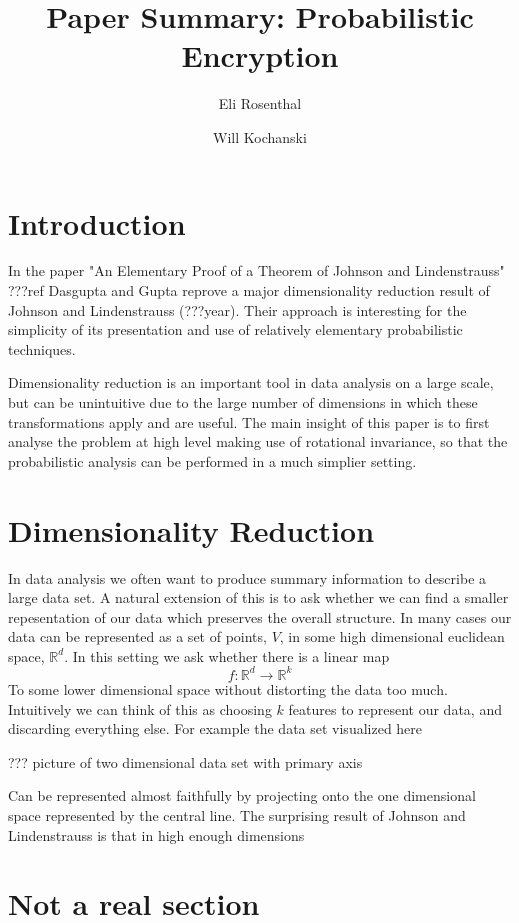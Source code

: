 \documentclass[11pt]{article}
\author{Eli Rosenthal \and Will Kochanski}
\date{}
\title{Paper Summary: Probabilistic Encryption}
\newcommand{\arr}{\rightarrow}
\newcommand{\R}{\mathbb{R}}
\begin{document}
\maketitle
\section{Introduction}
In the paper "An Elementary Proof of a Theorem of Johnson and Lindenstrauss" ???ref Dasgupta and Gupta reprove a major dimensionality reduction result of Johnson and Lindenstrauss (???year). Their approach is interesting for the simplicity of its presentation and use of relatively elementary probabilistic techniques.

Dimensionality reduction is an important tool in data analysis on a large scale, but can be unintuitive due to the large number of dimensions in which these transformations apply and are useful. The main insight of this paper is to first analyse the problem at high level making use of rotational invariance, so that the probabilistic analysis can be performed in a much simplier setting.

\section{Dimensionality Reduction}
In data analysis we often want to produce summary information to describe a large data set. A natural extension of this is to ask whether we can find a smaller repesentation of our data which preserves the overall structure. In many cases our data can be represented as a set of points, $V$, in some high dimensional euclidean space, $\R^d$. In this setting we ask whether there is a linear map
\[ f : \R^d \arr \R^k \]
To some lower dimensional space without distorting the data too much. Intuitively we can think of this as choosing $k$ features to represent our data, and discarding everything else. For example the data set visualized here

??? picture of two dimensional data set with primary axis

Can be represented almost faithfully by projecting onto the one dimensional space represented by the central line. The surprising result of Johnson and Lindenstrauss is that in high enough dimensions 



\section{Not a real section}
\end{document}
